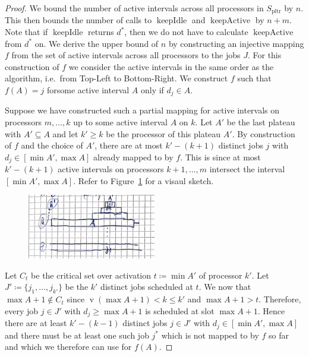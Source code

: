 \documentclass[a4paper]{article}
\DeclareMathOperator{\pltr}{pltr}
\DeclareMathOperator{\vol}{v}
\DeclareMathOperator{\keepidle}{keepIdle}
\DeclareMathOperator{\keepactive}{keepActive}
\begin{document}
\begin{proof}
  We bound the number of active intervals across all processors in $S_{\pltr}$ by $n$.
  This then bounds the number of calls to $\keepidle$ and $\keepactive$ by $n + m$.
  Note that if $\keepidle$ returns $d^*$, then we do not have to calculate $\keepactive$ from $d^*$ on.
  We derive the upper bound of $n$ by constructing an injective mapping $f$ from the set of active intervals across all processors to the jobs $J$.
  For this construction of $f$ we consider the active intervals in the same order as the algorithm, i.e.\ from Top-Left to Bottom-Right.
  We construct $f$ such that $f(A) = j$ forsome active interval $A$ only if $d_j \in A$.

  Suppose we have constructed such a partial mapping for active intervals on processors $m, \ldots, k$ up to some active interval $A$ on $k$.
  Let $A'$ be the last plateau with $A' \subseteq A$ and let $k' \geq k$ be the processor of this plateau $A'$.
  By construction of $f$ and the choice of $A'$, there are at most $k' - (k + 1)$ distinct jobs $j$ with $d_j \in [\min A', \max A]$ already mapped to by $f$.
  This is since at most $k' - (k+1)$ active intervals on processors $k+1, \ldots, m$ intersect the interval $[\min A', \max A]$.
  Refer to Figure~\ref{fig:running_time} for a visaul sketch.

  \begin{figure}[H]
    \centering
    \includegraphics[width=0.5\textwidth]{graphics/sketches/running_time.png}\label{fig:running_time}
    \caption{}
  \end{figure}

  Let $C_t$ be the critical set over activation $t \coloneqq \min A'$ of processor $k'$.
  Let $J' \coloneqq \{ j_1, \ldots, j_{k'} \}$ be the $k'$ distinct jobs scheduled at $t$.
  We now that $\max A + 1 \notin C_t$ since $\vol(\max A + 1) < k \leq k'$ and $\max A + 1 > t$.
  Therefore, every job $j \in J'$ with $d_j \geq \max A + 1$ is scheduled at slot $\max A + 1$.
  Hence there are at least $k' - (k-1)$ distinct jobs $j \in J'$ with $d_j \in [\min A', \max A]$ and there must be at least one such job $j^*$ which is not mapped to by $f$ so far and which we therefore can use for $f(A)$.
\end{proof}
%


\end{document}
